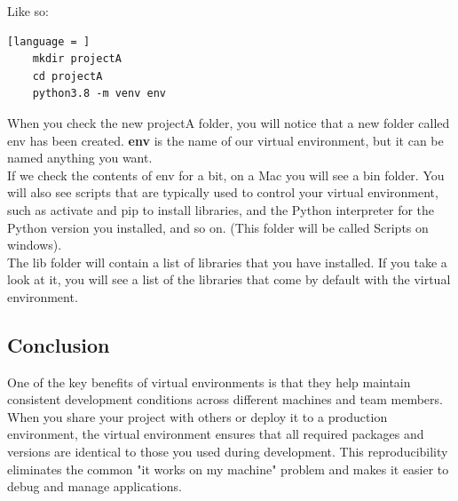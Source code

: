 \documentclass[12pt]{article}
\begin{document}
Like so:

\begin{lstlisting}[language = ]
    mkdir projectA
    cd projectA
    python3.8 -m venv env
\end{lstlisting}

When you check the new projectA folder, you will notice that a new folder called env has been created. \textbf{env} is the name of our virtual environment, but it can be named anything you want.\\

If we check the contents of env for a bit, on a Mac you will see a bin folder. You will also see scripts that are typically used to control your virtual environment, such as activate and pip to install libraries, and the Python interpreter for the Python version you installed, and so on. (This folder will be called Scripts on windows).\\

The lib folder will contain a list of libraries that you have installed. If you take a look at it, you will see a list of the libraries that come by default with the virtual environment.\\

\subsection{Conclusion}


One of the key benefits of virtual environments is that they help maintain consistent development conditions across different machines and team members. When you share your project with others or deploy it to a production environment, the virtual environment ensures that all required packages and versions are identical to those you used during development. This reproducibility eliminates the common "it works on my machine" problem and makes it easier to debug and manage applications.\\
\end{document}
